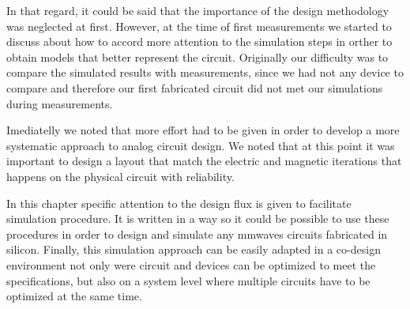In that regard, it could be said that the importance of  the design methodology was neglected at first. However, at the time of first measurements we started to discuss about how to accord more attention to the simulation steps in orther to obtain models that better represent the circuit. Originally our difficulty was to compare the simulated results with measurements, since we had not any device to compare and therefore our first fabricated circuit did not met our simulations during measurements.

Imediatelly we noted that more effort had to be given in order to develop a more systematic approach to analog circuit design. We noted that at this point it was important to design a layout that match the electric and magnetic iterations that happens on the physical circuit with reliability.

In this chapter specific attention to the design flux is given to facilitate simulation procedure. It is written in a way so it could be possible to use these procedures in order to design and simulate any \gls{mmwaves} circuits fabricated in silicon. Finally, this simulation approach can be easily adapted in a co-design environment not only were circuit and devices can be optimized to meet the specifications, but also on a system level where multiple circuits have to be optimized at the same time.
